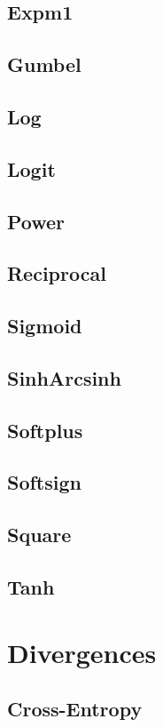 \documentclass{article}
\begin{document}
\subsection{Expm1}
\subsection{Gumbel}
\subsection{Log}
\subsection{Logit}
\subsection{Power}
\subsection{Reciprocal}
\subsection{Sigmoid}
\subsection{SinhArcsinh}
\subsection{Softplus}
\subsection{Softsign}
\subsection{Square}
\subsection{Tanh}

\section{Divergences}
\subsection{Cross-Entropy}
\end{document}
